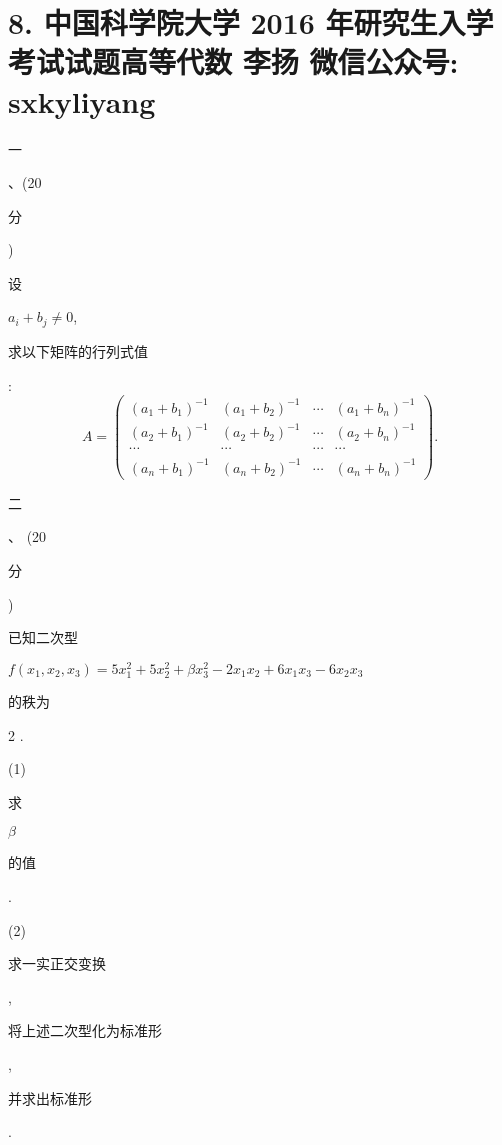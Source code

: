 \documentclass[10pt]{article}
\begin{document}
\section{8. 中国科学院大学 2016 年研究生入学考试试题高等代数 
 李扬 
 微信公众号: sxkyliyang}
\begin{CJK}{UTF8}{mj}一\end{CJK}、(20 \begin{CJK}{UTF8}{mj}分\end{CJK}) \begin{CJK}{UTF8}{mj}设\end{CJK} $a_{i}+b_{j} \neq 0$, \begin{CJK}{UTF8}{mj}求以下矩阵的行列式值\end{CJK}:
$$
A=\left(\begin{array}{cccc}
\left(a_{1}+b_{1}\right)^{-1} & \left(a_{1}+b_{2}\right)^{-1} & \cdots & \left(a_{1}+b_{n}\right)^{-1} \\
\left(a_{2}+b_{1}\right)^{-1} & \left(a_{2}+b_{2}\right)^{-1} & \cdots & \left(a_{2}+b_{n}\right)^{-1} \\
\cdots & \cdots & \cdots & \cdots \\
\left(a_{n}+b_{1}\right)^{-1} & \left(a_{n}+b_{2}\right)^{-1} & \cdots & \left(a_{n}+b_{n}\right)^{-1}
\end{array}\right) .
$$
\begin{CJK}{UTF8}{mj}二\end{CJK}、 (20 \begin{CJK}{UTF8}{mj}分\end{CJK}) \begin{CJK}{UTF8}{mj}已知二次型\end{CJK} $f\left(x_{1}, x_{2}, x_{3}\right)=5 x_{1}^{2}+5 x_{2}^{2}+\beta x_{3}^{2}-2 x_{1} x_{2}+6 x_{1} x_{3}-6 x_{2} x_{3}$ \begin{CJK}{UTF8}{mj}的秩为\end{CJK} 2 .

(1) \begin{CJK}{UTF8}{mj}求\end{CJK} $\beta$ \begin{CJK}{UTF8}{mj}的值\end{CJK}.

(2) \begin{CJK}{UTF8}{mj}求一实正交变换\end{CJK}, \begin{CJK}{UTF8}{mj}将上述二次型化为标准形\end{CJK}, \begin{CJK}{UTF8}{mj}并求出标准形\end{CJK}.
\end{document}
